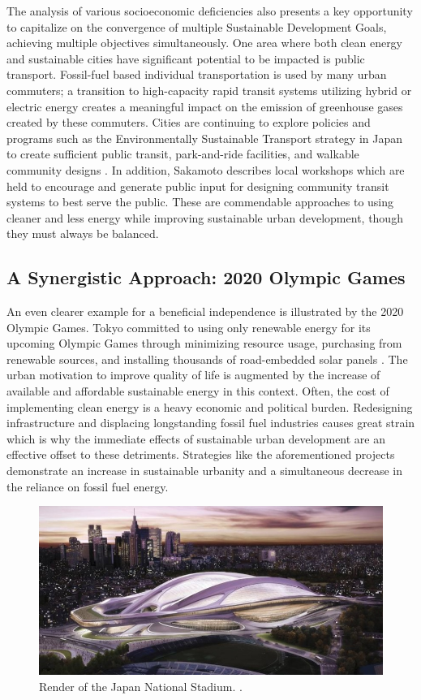 \documentclass[10pt, oneside, letterpaper]{article}
\begin{document}
\begin{multicols}{2}
	The analysis of various socioeconomic deficiencies also presents a key opportunity to capitalize on the convergence of multiple Sustainable Development Goals, achieving multiple objectives simultaneously. One area where both clean energy and sustainable cities have significant potential to be impacted is public transport. Fossil-fuel based individual transportation is used by many urban commuters; a transition to high-capacity rapid transit systems utilizing hybrid or electric energy creates a meaningful impact on the emission of greenhouse gases created by these commuters. Cities are continuing to explore policies and programs such as the Environmentally Sustainable Transport strategy in Japan to create sufficient public transit, park-and-ride facilities, and walkable community designs \cite{Sakamoto2008}. In addition, Sakamoto describes local workshops which are held to encourage and generate public input for designing community transit systems to best serve the public. These are commendable approaches to using cleaner and less energy while improving sustainable urban development, though they must always be balanced.
	
	\subsection{A Synergistic Approach: 2020 Olympic Games}
	
	An even clearer example for a beneficial independence is illustrated by the 2020 Olympic Games. Tokyo committed to using only renewable energy for its upcoming Olympic Games through minimizing resource usage, purchasing from renewable sources, and installing thousands of road-embedded solar panels \cite{Movellan2015}. The urban motivation to improve quality of life is augmented by the increase of available and affordable sustainable energy in this context. Often, the cost of implementing clean energy is a heavy economic and political burden. Redesigning infrastructure and displacing longstanding fossil fuel industries causes great strain which is why the immediate effects of sustainable urban development are an effective offset to these detriments. Strategies like the aforementioned projects demonstrate an increase in sustainable urbanity and a simultaneous decrease in the reliance on fossil fuel energy.
	
	\begin{figure}[H]
		\centering
		\includegraphics[width=\linewidth]{tokyo-stadium}
		\caption{Render of the Japan National Stadium. \protect\cite{Virtuoso2018}.}
		\label{fig:tokyo-stadium}
	\end{figure}
	

\end{multicols}
\end{document}
